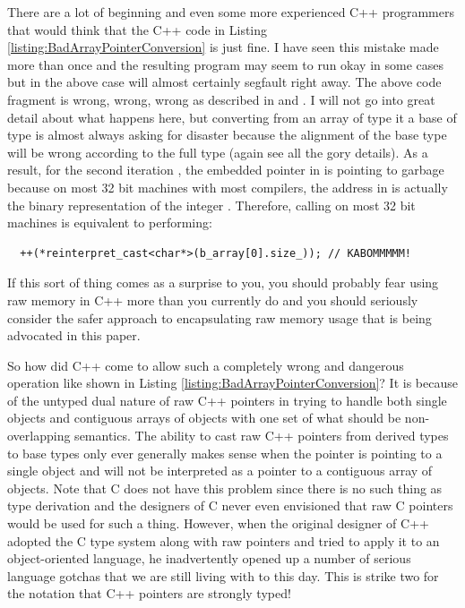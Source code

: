 \documentclass[pdf,ps2pdf,11pt]{SANDreport}
\begin{document}
There are a lot of beginning and even some more experienced C++
programmers that would think that the C++ code in Listing
{}\ref{listing:BadArrayPointerConversion} is just fine.  I have seen
this mistake made more than once and the resulting program may seem to
run okay in some cases but in the above case will almost certainly
segfault right away.  The above code fragment is wrong, wrong, wrong
as described in {}\cite[Gotcha \#33]{C++Gotchas03} and {}\cite[Item
\#100]{C++CodingStandards05}.  I will not go into great detail about
what happens here, but converting from an array of type {}
it a base of type {} is almost always asking for disaster
because the alignment of the base type {} will be wrong
according to the full type {} (again see {}\cite[Gotcha
\#33]{C++Gotchas03} all the gory details).  As a result, for the
second iteration {}, the embedded pointer in
{} is pointing to garbage because on
most 32 bit machines with most compilers, the address in
{} is actually the binary
representation of the integer {}.
Therefore, calling {} on most 32 bit
machines is equivalent to performing:

{\small\begin{verbatim}
  ++(*reinterpret_cast<char*>(b_array[0].size_)); // KABOMMMMM!
\end{verbatim}}

If this sort of thing comes as a surprise to you, you should probably
fear using raw memory in C++ more than you currently do and you should
seriously consider the safer approach to encapsulating raw memory
usage that is being advocated in this paper.

So how did C++ come to allow such a completely wrong and dangerous
operation like shown in Listing
{}\ref{listing:BadArrayPointerConversion}?  It is because of the
untyped dual nature of raw C++ pointers in trying to handle both
single objects and contiguous arrays of objects with one set of what
should be non-overlapping semantics.  The ability to cast raw C++
pointers from derived types to base types only ever generally makes
sense when the pointer is pointing to a single object and will not be
interpreted as a pointer to a contiguous array of objects.  Note that
C does not have this problem since there is no such thing as type
derivation and the designers of C never even envisioned that raw C
pointers would be used for such a thing.  However, when the original
designer of C++ adopted the C type system along with raw pointers and
tried to apply it to an object-oriented language, he inadvertently
opened up a number of serious language gotchas that we are still
living with to this day.  This is strike two for the notation that C++
pointers are strongly typed!
\end{document}
